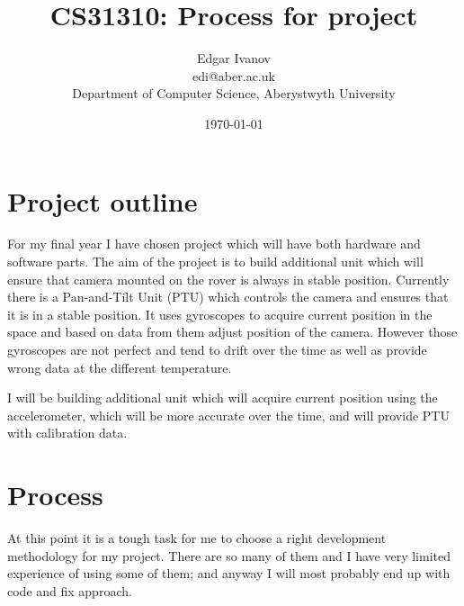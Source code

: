 \documentclass[]{report}
\begin{document}
\title{CS31310: Process for project}
\author{Edgar Ivanov\\ edi@aber.ac.uk \\ Department of Computer Science, Aberystwyth University}
\date{\today}
\maketitle
\section*{Project outline}
For my final year I have chosen project which will have both hardware and software parts. The aim of the project is to build additional unit which will ensure that camera mounted on the rover is always in stable position. Currently there is a Pan-and-Tilt Unit (PTU) which controls the camera and ensures that it is in a stable position. It uses gyroscopes to acquire current position in the space and based on data from them adjust position of the camera. However those gyroscopes are not perfect and tend to drift over the time as well as provide wrong data at the different temperature. 

I will be building additional unit which will acquire current position using the accelerometer, which will be more accurate over the time, and will provide PTU with calibration data.

\section*{Process}
At this point it is a tough task for me to choose a right development methodology for my project. There are so many of them and I have very limited experience of using some of them; and anyway I will most probably end up with code and fix approach.



\end{document}
